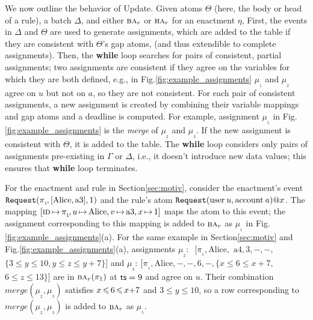 We now outline the behavior of {\sf Update}.
Given atoms $\Theta$ (here, the body or head of a rule),
a batch $\Delta$,
and either $\BODY/_r$ or $\HEAD/_r$ for an enactment $\eta$,
First,
the events in $\Delta$ and $\Theta$ are used to generate assignments,
which are added to the table
if they are consistent with $\Theta$'s gap atoms,
(and thus extendible to complete assignments).
Then, the {\bf while} loop searches for
pairs of consistent, partial assignments;
two assignments are consistent if they agree
on the variables for which they are both defined,
e.g., in Fig.\:\ref{fig:example_assignments}
$\mu_{_1\!}$ and $\mu_{_2\!}$ agree on $u$ but not on $a$,
so they are not consistent.
For each pair of consistent assignments,
a new assignment is created
by combining their variable mappings and gap atoms
and a deadline is computed.
For example, assignment $\mu_{_5\!}$ in Fig.\:\ref{fig:example_assignments}
is the {\em merge} of $\mu_{_2\!}$ and $\mu_{_3\!}$.
If the new assignment is consistent with $\Theta$,
it is added to the table.
The {\bf while} loop considers only pairs of assignments
pre-existing in $\Gamma$ or $\Delta$,
i.e., it doesn't introduce new data values;
this ensures that {\bf while} loop terminates.

\begin{examp}
  For the enactment and rule in Section\:\ref{sec:motiv},
  consider the enactment's event
  $\texttt{Request}(\pi_{_1\!}, [\mbox{Alice}, \mbox{a3}],1)$
  and the rule's atom
  $\texttt{Request}(\mbox{user}\:u, \mbox{account}\:a)@x$.
  The mapping
  $[{\textsc{id}}\,{\mapsto}\, \pi_{_1\!},\allowbreak
  u\,{\mapsto}\, \mbox{Alice},\allowbreak
  v\,{\mapsto}\, \mbox{a3},\allowbreak
  x\,{\mapsto}\, 1]$
  maps the atom to this event;
  the assignment
  corresponding to this mapping
  is added to $\BODY/_r$
  as $\mu_{_1\!}$ in
  Fig.\:\ref{fig:example_assignments}(a).
  For the same example in Section\:\ref{sec:motiv}
  and Fig.\:\ref{fig:example_assignments}(a),
  assignments $\mu_{_2}{:}\:$
  [$\pi_{_1\!},\mbox{Alice},$
  $\mbox{a4}, 3, -, -,$
  $\{3{\leq}y{\leq}10, y{\leq} {z}{\leq} y{+}7\}$]
  and
  $\mu_{_3}{:}\:
  [\pi_{_1\!}, \mbox{Alice}, -, -, 6, -,
  \{x {\leq} 6{\leq} x{+}7,$ 
  $6{\leq} {z}{\leq} 13\}$]
  are in $\BODY/_r(\pi_{1})$ at $\textsf{ts}=9$
  and agree on $u$.
  Their combination $\textit{merge}(\mu_{_2\!},\mu_{_3\!})$
  satisfies $x \,{\leqslant}\, 6 \allowbreak \,{\leqslant}\, x {+} 7$
  and 
  $3{\leq}y{\leq}10$,
  so a row corresponding to
  $\textit{merge}(\mu_{_2\!},\mu_{_3\!})$ is added 
  to $\BODY/_r$ as $\mu_{_5\!}$.
\end{examp}

